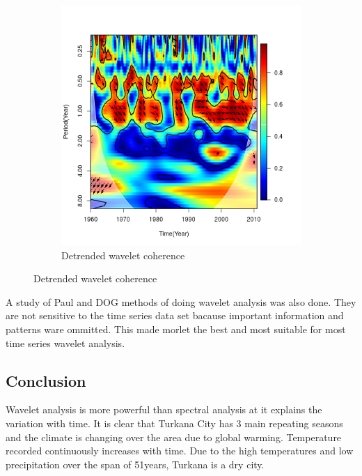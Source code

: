 \documentclass[12pt,a4paper]{article}
\begin{document}
\begin{figure}[h]
\begin{subfigure}[b]{0.3\textheight}
	\includegraphics[width=\linewidth]{wavelet_coherenceD}
	\caption{Detrended wavelet coherence}
	\label{fig:waveletcoherenced}
\end{subfigure}
\end{figure}
\noindent A study of Paul and DOG methods of doing wavelet analysis was also done. They are not sensitive to the time series data set bacause important information and patterns ware ommitted. This made morlet the best and most suitable for most time series wavelet analysis.
\subsection{Conclusion}
Wavelet analysis is more powerful than spectral analysis at it explains the variation with time. It is clear that Turkana City has 3 main repeating seasons and the climate is changing over the area due to global warming. Temperature recorded continuously increases with time. Due to the high temperatures and low precipitation over the span of 51years, Turkana is a dry city.
\newpage


\end{document}
